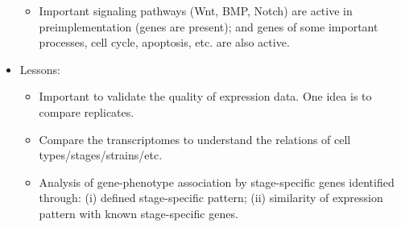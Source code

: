 \documentclass{report}
\begin{document}
\begin{itemize}
\begin{itemize}
		\item Important signaling pathways (Wnt, BMP, Notch) are active in preimplementation (genes are present); and genes of some important processes, cell cycle, apoptosis, etc. are also active. 
		
	\end{itemize}
	
	\item Lessons: 
	\begin{itemize}
		
		\item Important to validate the quality of expression data. One idea is to compare replicates. 
		\item Compare the transcriptomes to understand the relations of cell types/stages/strains/etc. 
		\item Analysis of gene-phenotype association by stage-specific genes identified through: (i) defined stage-specific pattern; (ii) similarity of expression pattern with known stage-specific genes. 
		
	\end{itemize}
\end{itemize}
	
\end{document}
